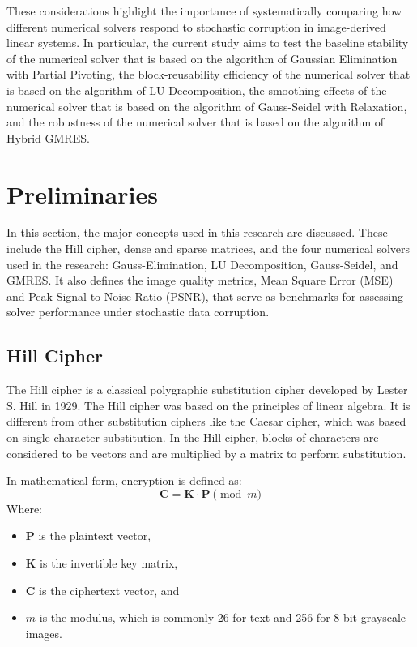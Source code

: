 \documentclass[11pt]{article}
\begin{document}
These considerations highlight the importance of systematically comparing how different numerical solvers respond to stochastic corruption in image-derived linear systems. In particular, the current study aims to test the baseline stability of the numerical solver that is based on the algorithm of Gaussian Elimination with Partial Pivoting, the block-reusability efficiency of the numerical solver that is based on the algorithm of LU Decomposition, the smoothing effects of the numerical solver that is based on the algorithm of Gauss-Seidel with Relaxation, and the robustness of the numerical solver that is based on the algorithm of Hybrid GMRES.


\section{Preliminaries}

In this section, the major concepts used in this research are discussed. These include the Hill cipher, dense and sparse matrices, and the four numerical solvers used in the research: Gauss-Elimination, LU Decomposition, Gauss-Seidel, and GMRES. It also defines the image quality metrics, Mean Square Error (MSE) and Peak Signal-to-Noise Ratio (PSNR), that serve as benchmarks for assessing solver performance under stochastic data corruption.

\subsection{Hill Cipher}

The Hill cipher is a classical polygraphic substitution cipher developed by Lester S. Hill in 1929. The Hill cipher was based on the principles of linear algebra. It is different from other substitution ciphers like the Caesar cipher, which was based on single-character substitution. In the Hill cipher, blocks of characters are considered to be vectors and are multiplied by a matrix to perform substitution.

In mathematical form, encryption is defined as:
$$ \mathbf{C} = \mathbf{K} \cdot \mathbf{P} \pmod{m} $$
Where:
\begin{itemize}
    \item $\mathbf{P}$ is the plaintext vector,
    \item $\mathbf{K}$ is the invertible key matrix,
    \item $\mathbf{C}$ is the ciphertext vector, and
    \item $m$ is the modulus, which is commonly 26 for text and 256 for 8-bit grayscale images.
\end{itemize}
\end{document}
